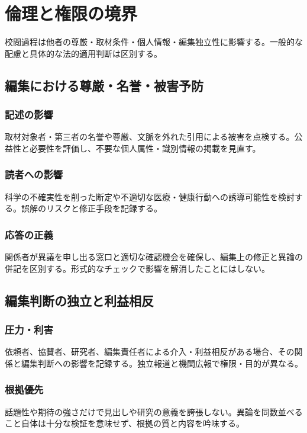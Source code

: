 \documentclass[a4paper,11pt]{article}
\begin{document}
\section{倫理と権限の境界}
\par 校閲過程は他者の尊厳・取材条件・個人情報・編集独立性に影響する。一般的な配慮と具体的な法的適用判断は区別する。\par\medskip
\subsection{編集における尊厳・名誉・被害予防}
\subsubsection{記述の影響}
\par 取材対象者・第三者の名誉や尊厳、文脈を外れた引用による被害を点検する。公益性と必要性を評価し、不要な個人属性・識別情報の掲載を見直す。\par\medskip
\subsubsection{読者への影響}
\par 科学の不確実性を削った断定や不適切な医療・健康行動への誘導可能性を検討する。誤解のリスクと修正手段を記録する。\par\medskip
\subsubsection{応答の正義}
\par 関係者が異議を申し出る窓口と適切な確認機会を確保し、編集上の修正と異論の併記を区別する。形式的なチェックで影響を解消したことにはしない。\par\medskip
\subsection{編集判断の独立と利益相反}
\subsubsection{圧力・利害}
\par 依頼者、協賛者、研究者、編集責任者による介入・利益相反がある場合、その関係と編集判断への影響を記録する。独立報道と機関広報で権限・目的が異なる。\par\medskip
\subsubsection{根拠優先}
\par 話題性や期待の強さだけで見出しや研究の意義を誇張しない。異論を同数並べること自体は十分な検証を意味せず、根拠の質と内容を吟味する。\par\medskip
\end{document}
